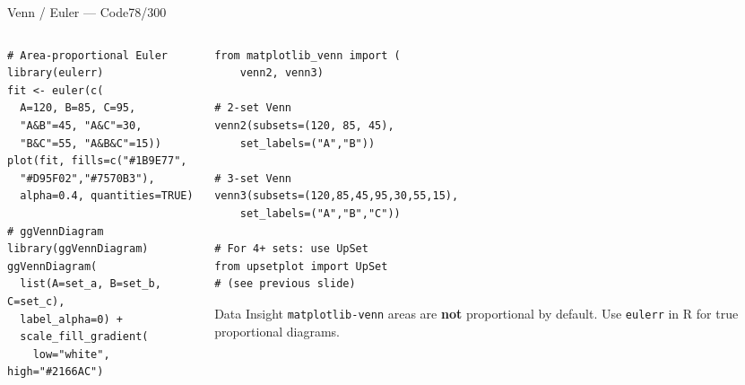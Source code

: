 \documentclass[10pt]{beamer}
\newcommand{\smark}[1]{\hfill{\scriptsize\color{codegray}#1}}
\begin{document}
\begin{frame}[fragile]{Venn / Euler --- Code}\smark{78/300}
\begin{columns}[T]
\begin{column}{0.48\textwidth}
\begin{lstlisting}[style=Rstyle]
# Area-proportional Euler
library(eulerr)
fit <- euler(c(
  A=120, B=85, C=95,
  "A&B"=45, "A&C"=30,
  "B&C"=55, "A&B&C"=15))
plot(fit, fills=c("#1B9E77",
  "#D95F02","#7570B3"),
  alpha=0.4, quantities=TRUE)

# ggVennDiagram
library(ggVennDiagram)
ggVennDiagram(
  list(A=set_a, B=set_b, C=set_c),
  label_alpha=0) +
  scale_fill_gradient(
    low="white", high="#2166AC")
\end{lstlisting}
\end{column}
\begin{column}{0.48\textwidth}
\begin{lstlisting}[style=Pystyle]
from matplotlib_venn import (
    venn2, venn3)

# 2-set Venn
venn2(subsets=(120, 85, 45),
    set_labels=("A","B"))

# 3-set Venn
venn3(subsets=(120,85,45,95,30,55,15),
    set_labels=("A","B","C"))

# For 4+ sets: use UpSet
from upsetplot import UpSet
# (see previous slide)
\end{lstlisting}
\vspace{0.1cm}
\begin{exampleblock}{Data Insight}
    \scriptsize \texttt{matplotlib-venn} areas are \textbf{not} proportional by default. Use \texttt{eulerr} in R for true proportional diagrams.
\end{exampleblock}
\end{column}
\end{columns}
\end{frame}
\end{document}
